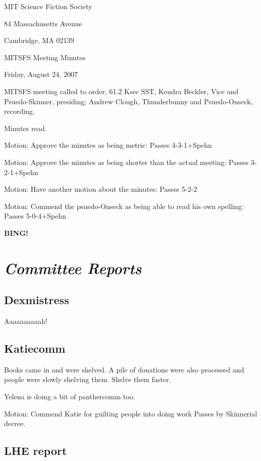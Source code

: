 \documentclass[10pt]{article}
\newcommand{\bing}{{\bf BING!} }
\newcommand{\goto}[1]{\bing \vskip 12pt \section*{{\em{#1}}}}
\begin{document}
\begin{center}

MIT Science Fiction Society

84 Massachusetts Avenue

Cambridge, MA 02139

\vspace{12pt}

MITSFS Meeting Minutes

Friday, August 24, 2007

\end{center}

\vspace{18pt}

\setlength{\parskip}{6pt}

\noindent
MITSFS meeting called to order, 61.2 Ksec SST,
Kendra Beckler, Vice and Psuedo-Skinner, presiding; Andrew Clough, Thunderbunny and Psuedo-Onseck, recording.

Minutes read.

Motion:  Approve the minutes as being metric:  Passes 4-3-1+Spehn

Motion:  Approve the minutes as being shorter than the actual meeting: Passes 3-2-1+Spehn

Motion:  Have another motion about the minutes: Passes 5-2-2

Motion:  Commend the psuedo-Onseck as being able to read his own spelling:  Passes 5-0-4+Spehn

\goto{Committee Reports}

\subsection*{Dexmistress}

Aaaaaaaaaah!

\subsection*{Katiecomm}

Books came in and were shelved.  A pile of donations were also processed and people were slowly shelving them.  Shelve them faster.

Yelena is doing a bit of panthercomm too.

Motion:  Commend Katie for guilting people into doing work Passes by Skinnerial decree.

\subsection*{LHE report}
\end{document}

